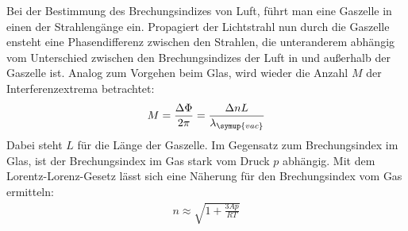 Bei der Bestimmung des Brechungsindizes von Luft, f\"uhrt man eine Gaszelle in einen der Strahleng\"ange ein. Propagiert der Lichtstrahl nun durch die Gaszelle ensteht eine Phasendifferenz zwischen
den Strahlen, die unteranderem abh\"angig vom Unterschied zwischen
den Brechungsindizes der Luft in und au\ss{}erhalb der Gaszelle ist. Analog zum Vorgehen beim Glas, wird wieder die Anzahl $M$ der Interferenzextrema betrachtet:
\begin{align}
    M = \frac{\Delta\Phi}{2\pi} = \frac{\Delta nL}{\lambda_{\symup{vac}}}
\end{align}
Dabei steht $L$ f\"ur die L\"ange der Gaszelle.
Im Gegensatz zum Brechungsindex im Glas, ist der Brechungsindex im Gas stark vom Druck $p$ abh\"angig. Mit dem Lorentz-Lorenz-Gesetz l\"asst sich eine N\"aherung \cite{lorentz} f\"ur den
Brechungsindex vom Gas ermitteln:
\begin{align}
    n \approx \sqrt{1+\frac{3Ap}{RT}}
\end{align}